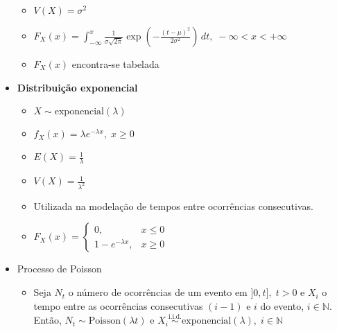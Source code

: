 \documentclass[a4paper]{report}
\newcommand{\bld}{\textbf}
\begin{document}
\begin{itemize}
\begin{itemize}
		\item $V(X)=\sigma^2$
		\item $F_X(x)=\int_{-\infty}^{x}\frac 1{\sigma\sqrt{2\pi}}\exp\left(-\frac{(t-\mu)^2}{2\sigma^2}\right)\,dt,\;-\infty<x<+\infty$
		\item $F_X(x)$ encontra-se tabelada
		\end{itemize}
		\item {\large \bld{Distribuição exponencial}}
		\begin{itemize}
		\item $X\sim\text{exponencial}(\lambda)$
		\item $f_X(x)=\lambda e^{-\lambda x},\;x\geq 0$
		\item $E(X)=\frac 1 \lambda$
		\item $V(X)=\frac 1{\lambda^2}$
		\item Utilizada na modelação de tempos entre ocorrências consecutivas.
		\item $F_X(x)=\begin{cases}
		0,&x\leq 0\\
		1-e^{-\lambda x},&x\geq 0
		\end{cases}$
		\end{itemize}
		\item Processo de Poisson
		\begin{itemize}
		\item Seja $N_t$ o número de ocorrências de um evento em $]0,t],\;t>0$ e $X_i$ o tempo entre as ocorrências consecutivas $(i-1)$ e $i$ do evento, $i\in\mathbb N$. Então, $N_t\sim \text{Poisson}(\lambda t)$ e $X_i\overset{\text{i.i.d.}}{\sim}\text{exponencial}(\lambda),\;i\in\mathbb N$
		\end{itemize}
	\end{itemize}
\end{document}
